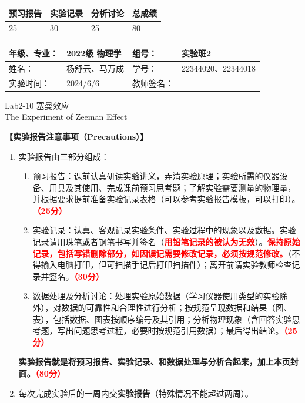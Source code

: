 \documentclass[dvipsnames, svgnames,a4paper,11pt]{article}
\begin{document}
	
	
	
	
	\begin{table}
		\renewcommand\arraystretch{1.7}
		\begin{tabularx}{\textwidth}{
				|X|X|X|X
				|X|X|X|X|}
			\hline
			\multicolumn{2}{|c|}{预习报告}&\multicolumn{2}{|c|}{实验记录}&\multicolumn{2}{|c|}{分析讨论}&\multicolumn{2}{|c|}{总成绩}\\
			\hline
			\LARGE25 & & \LARGE30 & & \LARGE25 & & \LARGE80 & \\
			\hline
		\end{tabularx}
	\end{table}
	
	\begin{table}
		\renewcommand\arraystretch{1.7}
		\begin{tabularx}{\textwidth}{|X|X|X|X|}
			\hline
			年级、专业： & 2022级 物理学 &组号： & 实验班2\\
			\hline
			姓名： & 杨舒云、马万成  & 学号： & 22344020、22344018\\
			\hline
			实验时间： & 2024/6/6 & 教师签名： & \\
			\hline
		\end{tabularx}
	\end{table}
	
	\begin{center}
		\LARGE Lab2-10 \quad 塞曼效应\\The Experiment of Zeeman Effect
	\end{center}
	
	
	\textbf{【实验报告注意事项（Precautions）】}
	\begin{enumerate}
		\item 实验报告由三部分组成：
		\begin{enumerate}
			\item 预习报告：课前认真研读实验讲义，弄清实验原理；实验所需的仪器设备、用具及其使用、完成课前预习思考题；了解实验需要测量的物理量，并根据要求提前准备实验记录表格（可以参考实验报告模板，可以打印）。\textcolor{red}{\textbf{（25分）}}
			\item 实验记录：认真、客观记录实验条件、实验过程中的现象以及数据。实验记录请用珠笔或者钢笔书写并签名（\textcolor{red}{\textbf{用铅笔记录的被认为无效}}）。\textcolor{red}{\textbf{保持原始记录，包括写错删除部分，如因误记需要修改记录，必须按规范修改。}}（不得输入电脑打印，但可扫描手记后打印扫描件）；离开前请实验教师检查记录并签名。\textcolor{red}{\textbf{（30分）}}
			\item 数据处理及分析讨论：处理实验原始数据（学习仪器使用类型的实验除外），对数据的可靠性和合理性进行分析；按规范呈现数据和结果（图、表），包括数据、图表按顺序编号及其引用；分析物理现象（含回答实验思考题，写出问题思考过程，必要时按规范引用数据）；最后得出结论。\textcolor{red}{\textbf{（25分）}}
		\end{enumerate}
		\textbf{实验报告就是将预习报告、实验记录、和数据处理与分析合起来，加上本页封面。\textcolor{red}{（80分）}}
		\item 每次完成实验后的一周内交\textbf{实验报告}（特殊情况不能超过两周）。
	\end{enumerate}
	
\end{document}
